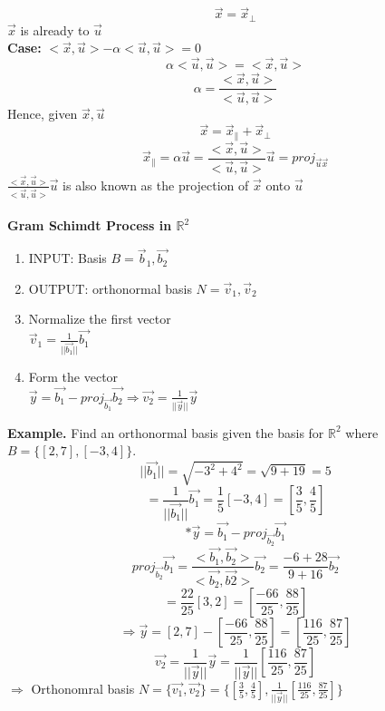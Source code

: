 \documentclass [12pt]{article}
\begin{document}
\[\overrightarrow{x}=\overrightarrow{x}_\bot\]
$\overrightarrow{x}$ is already to $\overrightarrow{u}$\\
\textbf{Case:} $<\overrightarrow{x},\overrightarrow{u}>-\alpha<\overrightarrow{u},\overrightarrow{u}>=0$
\[\alpha<\overrightarrow{u},\overrightarrow{u}>=<\overrightarrow{x},\overrightarrow{u}>\]
\[\alpha=\frac{<\overrightarrow{x},\overrightarrow{u}>}{<\overrightarrow{u},\overrightarrow{u}>}\]
Hence, given $\overrightarrow{x},\overrightarrow{u}$
\[\overrightarrow{x}=\overrightarrow{x}_\parallel+\overrightarrow{x}_\bot\]
\[\overrightarrow{x}_\parallel=\alpha\overrightarrow{u} = \frac{<\overrightarrow{x},\overrightarrow{u}>}{<\overrightarrow{u},\overrightarrow{u}>} \overrightarrow{u}=proj_{\overrightarrow{u}\overrightarrow{x}}\]
$\frac{<\overrightarrow{x},\overrightarrow{u}>}{<\overrightarrow{u},\overrightarrow{u}>} \overrightarrow{u}$ is also known as the projection of $\overrightarrow{x}$ onto $\overrightarrow{u}$\\\\
\textbf{Gram Schimdt Process in $\mathbb{R}^2$}
\begin{enumerate}[\quad*]
    \item INPUT: Basis $B={\overrightarrow{b}_1,\overrightarrow{b_2}}$
    \item OUTPUT: orthonormal basis $N={\overrightarrow{v}_1,\overrightarrow{v}_2}$
    \item Normalize the first vector\\
    $\overrightarrow{v}_1=\frac{1}{||\overrightarrow{b_1}||}\overrightarrow{b_1}$
    \item Form the vector\\
    $\overrightarrow{y}=\overrightarrow{b_1}-proj_{\overrightarrow{b_1}}\overrightarrow{b_2}\Rightarrow \overrightarrow{v_2}=\frac{1}{||\overrightarrow{y}||}\overrightarrow{y}$
\end{enumerate}
\noindent\textbf{Example.} Find an orthonormal basis given the basis for $\mathbb{R}^2$ where $B=\{[2,7],[-3,4]\}$.
\[||\overrightarrow{b_1}||=\sqrt{-3^2+4^2}=\sqrt{9+19}=5\]
\[=\frac{1}{||\overrightarrow{b_1}||}\overrightarrow{b_1}=\frac{1}{5}[-3,4]=[\frac{3}{5}, \frac{4}{5}]\]
\[*\overrightarrow{y}=\overrightarrow{b_1}-proj_{\overrightarrow{b_2}}\overrightarrow{b_1}\]
\[proj_{\overrightarrow{b_2}}\overrightarrow{b_1}=\frac{<\overrightarrow{b_1},\overrightarrow{b_2}>}{<\overrightarrow{b_2},\overrightarrow{b2}>}\overrightarrow{b_2}=\frac{-6+28}{9+16}\overrightarrow{b_2}\]
\[=\frac{22}{25}[3,2]=[\frac{-66}{25},\frac{88}{25}]\]
\[\Rightarrow\overrightarrow{y}=[2,7]-[\frac{-66}{25},\frac{88}{25}]=[\frac{116}{25},\frac{87}{25}]\]
\[\overrightarrow{v_2}=\frac{1}{||\overrightarrow{y}||}\overrightarrow{y}=\frac{1}{||\overrightarrow{y}||}[\frac{116}{25},\frac{87}{25}]\]
$\Rightarrow$ Orthonomral basis $N=\{\overrightarrow{v_1},\overrightarrow{v_2}\}= \{[\frac{3}{5}, \frac{4}{5}],\frac{1}{||\overrightarrow{y}||}[\frac{116}{25},\frac{87}{25}]\}$
\end{document}
